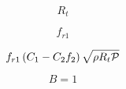 

\begin{equation}
R_t
\end{equation}

\begin{equation}
f_{r1}
\end{equation}

\begin{equation}
f_{r1} \left( C_1 - C_2f_2 \right) \sqrt{\rho R_t \cal P}
\end{equation}

\begin{equation}
B=1
\end{equation}


